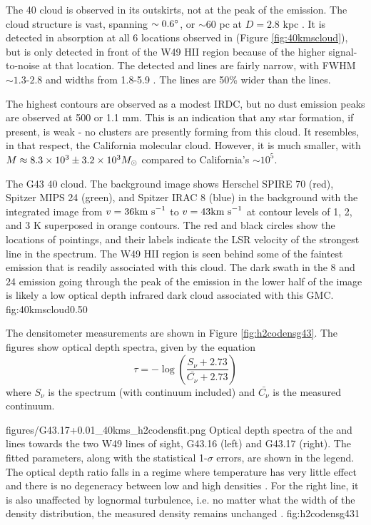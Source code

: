 The 40 \kms cloud is observed in its outskirts, not at the peak of the
\thirteenco emission.  The cloud structure is vast, spanning $\sim0.6^{\circ}$, 
or $\sim60$ pc at $D=2.8$ kpc \citep{Roman-Duval2009a}.  It is detected in \oneone
absorption at all 6 locations observed in \formaldehyde (Figure
\ref{fig:40kmscloud}), but \twotwo is only detected in front of the W49 HII
region because of the higher signal-to-noise at that location.  The detected
\thirteenco and \formaldehyde lines are fairly narrow, with \formaldehyde FWHM
$\sim1.3$-$2.8$ \kms and \thirteenco widths from 1.8-5.9 \kms.  The \thirteenco
lines are 50\% wider than the \formaldehyde lines.

The highest \thirteenco contours are observed as a modest IRDC, but no dust
emission peaks are observed at 500 \um or 1.1 mm.  This is an indication that
any star formation, if present, is weak - no clusters are presently forming
from this cloud.   It resembles, in that respect, the California molecular
cloud.  However, it is much smaller, with $M\approx8.3\times10^{3}\pm3.2\times10^{3} M_{\odot}$
compared to California's $\sim10^5$.

{The G43 40 \kms cloud.  The background image shows Herschel SPIRE 70 \um (red),
Spitzer MIPS 24 \um (green), and Spitzer IRAC 8 \um (blue) in the background with
the \thirteenco integrated image from $v=36 \textrm{km~s}^{-1}$ to $v=43 \textrm{km~s}^{-1}$ at contour levels of
1, 2, and 3 K superposed in orange contours.  The red and black circles
show the locations of \formaldehyde pointings, and their labels indicate the LSR velocity
of the strongest line in the spectrum.  The W49 HII region is seen
behind some of the faintest \thirteenco emission that is readily associated
with this cloud.  The dark swath in the 8 and 24 \um emission going through the
peak of the \thirteenco emission in the lower half of the image is likely a low
optical depth infrared dark cloud associated with this GMC.}
{fig:40kmscloud}{0.5}{0}

The \formaldehyde densitometer measurements are shown in Figure \ref{fig:h2codensg43}.
The figures show optical depth spectra, given by the equation
$$\tau = -\log\left(\frac{S_\nu + 2.73}{\bar{C_\nu} + 2.73}\right)$$
where $S_\nu$ is the spectrum (with continuum included) and $\bar{C_\nu}$ is
the measured continuum.

{figures/G43.17+0.01_40kms_h2codensfit.png}
{Optical depth spectra of the \oneone and \twotwo lines towards the two W49
lines of sight, G43.16 (left) and G43.17 (right).  The fitted parameters, along with the statistical 1-$\sigma$
errors, are shown in the legend.  The optical depth ratio falls in a regime
where temperature has very little effect and there is no degeneracy between low
and high densities \citep[see Figure 2 of][]{Ginsburg2011a}.  For the right line,
it is also unaffected by lognormal turbulence, i.e. no matter what the width of
the density distribution, the measured density remains unchanged \citep[see
Figure 3 of][]{Ginsburg2011a}.}
{fig:h2codensg43}{1}

